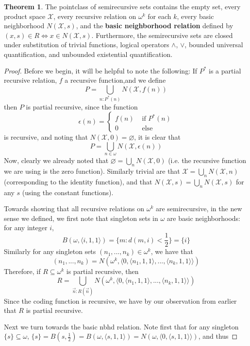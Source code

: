 \documentclass{article}
\theoremstyle{definition}
\newtheorem{theorem}{Theorem}[section]
\theoremstyle{plain}
\begin{document}
\begin{theorem}
    The pointclass of semirecursive sets contains the empty set, every product space $\mathcal{X}$, every recursive relation on $\omega^k$ for each $k$, every basic neighborhood $N(\mathcal{X},s)$, and the \textbf{basic neighborhood relation} defined by $(x,s) \in R \iff x \in N(\mathcal{X},s)$. Furthermore, the semirecursive sets are closed under substitution of trivial functions, logical operators $\wedge$, $\vee$, bounded universal quantification, and unbounded existential quantification.
\end{theorem}
\begin{proof}
    Before we begin, it will be helpful to note the following: If $P^*$ is a partial recursive relation, $f$ a recursive function,and we define
    \[ P = \bigcup_{n: P^*(n)} N(\mathcal{X},f(n)) \]
    then $P$ is partial recursive, since the function
    \[ \epsilon(n) = \begin{cases}
    					f(n) & \textrm{ if } P^*(n) \\
    					0 & \textrm{ else}
    				 \end{cases} \]
    is recursive, and noting that $N(\mathcal{X},0) = \varnothing$, it is clear that
    \[ P = \bigcup_{n \in \omega} N(\mathcal{X},\epsilon(n)) \]
    Now, clearly we already noted that $\varnothing = \bigcup_n N(\mathcal{X},0)$ (i.e. the recursive function we are using is the zero function). Similarly trivial are that $\mathcal{X} = \bigcup_n N(\mathcal{X},n)$ (corresponding to the identity function), and that $N(\mathcal{X},s) = \bigcup_n N(\mathcal{X},s)$ for any $s$ (using the constant functions).
    \par Towards showing that all recursive relations on $\omega^k$ are semirecursive, in the new sense we defined, we first note that singleton sets in $\omega$ are basic neighborhoods: for any integer $i$,
    \[ B(\omega, \langle i,1,1 \rangle ) = \{ m: d(m,i) < \frac{1}{2} \} = \{i\} \] 
    Similarly for any singleton sets $(n_1,...,n_k) \in \omega^k$, we have that
    \[ (n_1,...,n_k) = N(\omega^k, \langle 0,\langle n_1,1,1 \rangle,...,\langle n_k,1,1 \rangle \rangle) \]
    Therefore, if $R \subseteq \omega^k$ is partial recursive, then 
    \[ R = \bigcup_{\vec{n}:R(\vec{n})} N(\omega^k,\langle 0,\langle n_1,1,1 \rangle,...,\langle n_k,1,1 \rangle \rangle)  \]
    Since the coding function is recursive, we have by our observation from earlier that $R$ is partial recursive. 
    \par Next we turn towards the basic nbhd relation. Note first that for any singleton $\{s\} \subseteq \omega$, $\{s\} = B(s,\frac{1}{2}) = B(\omega,\langle s,1,1 \rangle ) = N(\omega, \langle 0,\langle s,1,1 \rangle \rangle )$, and thus  

\end{proof}
\end{document}
